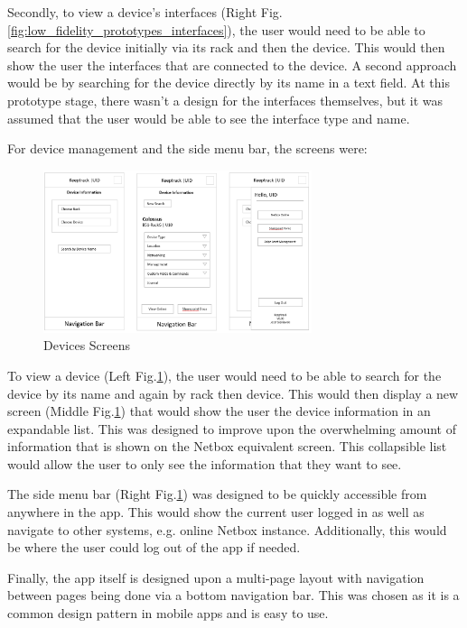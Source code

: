 \documentclass [11pt,a4paper]{article}
\begin{document}
Secondly, to view a device's interfaces (Right Fig.\ref{fig:low_fidelity_prototypes_interfaces}), the user would need to be able to search for the device initially via its rack and then the device. This would then show the user the interfaces that are connected to the device. A second approach would be by searching for the device directly by its name in a text field. At this prototype stage, there wasn't a design for the interfaces themselves, but it was assumed that the user would be able to see the interface type and name. 

For device management and the side menu bar, the screens were:
\begin{figure}[H]
    \centering
    \includegraphics[width=0.70\textwidth]{images/initial_prototype_devices.png}
    \caption{Devices Screens}
    \label{fig:low_fidelity_prototypes_devices}
\end{figure}

To view a device (Left Fig.\ref{fig:low_fidelity_prototypes_devices}), the user would need to be able to search for the device by its name and again by rack then device. This would then display a new screen (Middle Fig.\ref{fig:low_fidelity_prototypes_devices}) that would show the user the device information in an expandable list. This was designed to improve upon the overwhelming amount of information that is shown on the Netbox equivalent screen. This collapsible list would allow the user to only see the information that they want to see.

The side menu bar (Right Fig.\ref{fig:low_fidelity_prototypes_devices}) was designed to be quickly accessible from anywhere in the app. This would show the current user logged in as well as navigate to other systems, e.g. online Netbox instance. Additionally, this would be where the user could log out of the app if needed.

Finally, the app itself is designed upon a multi-page layout with navigation between pages being done via a bottom navigation bar. This was chosen as it is a common design pattern in mobile apps and is easy to use. 
\end{document}
